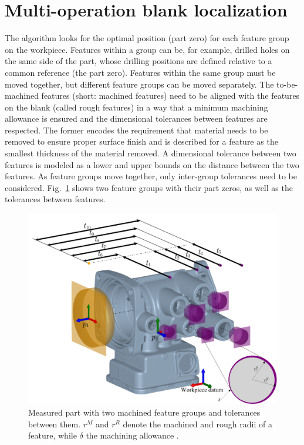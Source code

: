 \documentclass{juliacon}
\begin{document}

\section{Multi-operation blank localization}
\label{sec:algo}

The algorithm looks for the optimal position (part zero) for each feature group on the workpiece. 
Features within a group can be, for example, drilled holes on the same side of the part, whose drilling positions are defined relative to a common reference (the part zero).
Features within the same group must be moved together, but different feature groups can be moved separately.
The to-be-machined features (short: machined features) need to be aligned with the features on the blank (called rough features) in a way that a minimum machining allowance is ensured and the dimensional tolerances between features are respected.
The former encodes the requirement that material needs to be removed to ensure proper surface finish and is described for a feature as the smallest thickness of the material removed.
A dimensional tolerance between two features is modeled as a lower and upper bounds on the distance between the two features.
As feature groups move together, only inter-group tolerances need to be considered.
Fig.~\ref{fig:hatfig} shows two feature groups with their part zeros, as well as the tolerances between features.

\begin{figure}[b]
	\centerline{\includegraphics[width=0.9\columnwidth]{cirp-annals-2023-figure-2.png}}
	\caption{Measured part with two machined feature groups and tolerances between them. $r^M$ and $r^R$ denote the machined and rough radii of a feature, while $\delta$ the machining allowance \cite{cserteg:2023_Annals}.}
	\label{fig:hatfig}
\end{figure}
\end{document}
